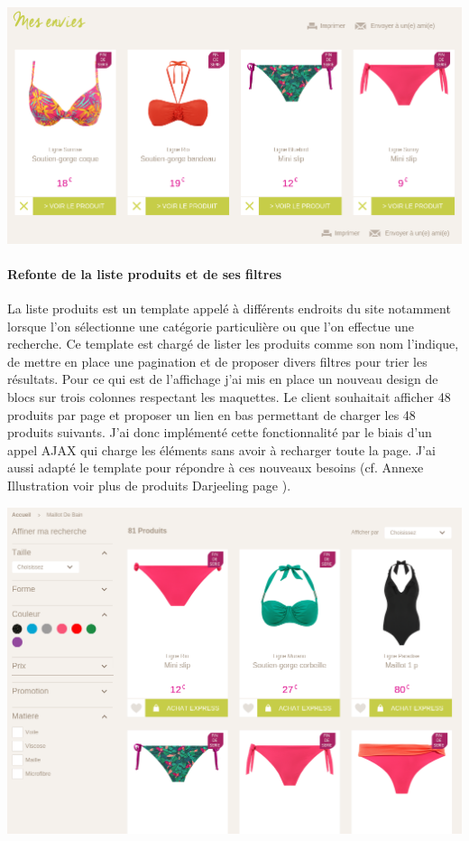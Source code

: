 \documentclass[a4paper,11pt,twoside]{report}
\begin{document}
	\begin{center}
	  \includegraphics[width=\textwidth]{images/darjeeling_wishlist.png} 
	  \label{darjeeling_wishlist}
	\end{center}
	
	\paragraph*{Refonte de la liste produits et de ses filtres}
	La liste produits est un template appelé à différents endroits du site notamment lorsque l'on sélectionne une catégorie particulière ou que l'on effectue une recherche. Ce template est chargé de lister les produits comme son nom l'indique, de mettre en place une pagination et de proposer divers filtres pour trier les résultats. Pour ce qui est de l'affichage j'ai mis en place un nouveau design de blocs sur trois colonnes respectant les maquettes. 
	Le client souhaitait afficher 48 produits par page et proposer un lien en bas permettant de charger les 48 produits suivants. J'ai donc implémenté cette fonctionnalité par le biais d'un appel AJAX qui charge les éléments sans avoir à recharger toute la page. J'ai aussi adapté le template pour répondre à ces nouveaux besoins (cf. Annexe Illustration voir plus de produits Darjeeling page \pageref{darjeeling_see_more_products}). 
	
	\begin{center}
	  \includegraphics[width=\textwidth]{images/darjeeling_list_products.png} 
	  \label{darjeeling_list_products}
	\end{center}
	
\end{document}
